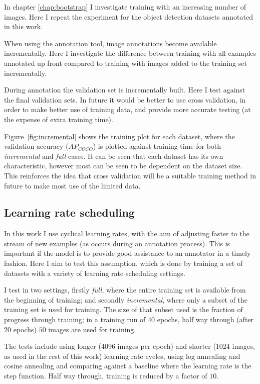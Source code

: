 In chapter \ref{chap:bootstrap} I investigate training with an increasing number of images. Here I repeat the experiment for the object detection datasets annotated in this work.

When using the annotation tool, image annotations become available incrementally. Here I investigate the difference between training with all examples annotated up front compared to training with images added to the training set incrementally. 

During annotation the validation set is incrementally built. Here I test against the final validation sets. In future it would be better to use cross validation, in order to make better use of training data, and provide more accurate testing (at the expense of extra training time). 

Figure~\ref{fig:incremental} shows the training plot for each dataset, where the validation accuracy ($AP_{COCO}$) is plotted against training time for both \emph{incremental} and \emph{full} cases. It can be seen that each dataset has its own characteristic, however most can be seen to be dependent on the dataset size. This reinforces the idea that cross validation will be a suitable training method in future to make most use of the limited data.


\subsection {Learning rate scheduling}
\label{sec:lr_schedule_exp}

In this work I use cyclical learning rates, with the aim of adjusting faster to the stream of new examples (as occurs during an annotation process). This is important if the model is to provide good assistance to an annotator in a timely fashion. Here I aim to test this assumption, which is done by training a set of datasets with a variety of learning rate scheduling settings. 

I test in two settings, firstly \emph{full}, where the entire training set is available from the beginning of training; and secondly \emph{incremental}, where only a subset of the training set is used for training. The size of that subset used is the fraction of progress through training; in a training run of $40$ epochs, half way through (after $20$ epochs) $50$ images are used for training. 

The tests include using longer (4096 images per epoch) and shorter (1024 images, as used in the rest of this work) learning rate cycles, using log annealing and cosine annealing and comparing against a baseline where the learning rate is the step function. Half way through, training is reduced by a factor of $10$.

